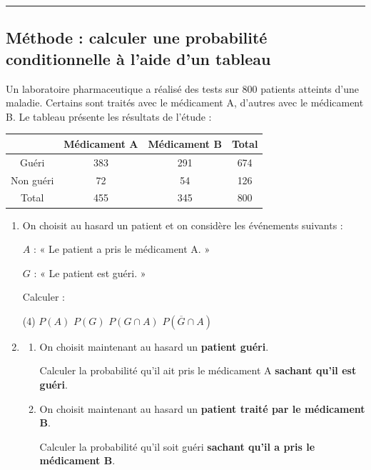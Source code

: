 \documentclass{article}
\theoremstyle{definition}
\begin{document}
\pagestyle{empty}


\large


{
  \normalsize
  \textbf{\Niveau} \hfill \textbf{\Chapitre} \hfill \textbf{\Document}
}
\hrule

\subsection*{Méthode : calculer une probabilité conditionnelle à l'aide d'un tableau}

\noindent

Un laboratoire pharmaceutique a réalisé des tests sur 800 patients atteints d'une maladie.
Certains sont traités avec le médicament A, d'autres avec le médicament B.
Le tableau présente les résultats de l'étude :

\begin{center}
\begin{tabular}{|c|c|c|c|}
\hline
 & Médicament A & Médicament B & Total \\
\hline
Guéri & 383 & 291 & 674 \\
\hline
Non guéri & 72 & 54 & 126 \\
\hline
Total & 455 & 345 & 800 \\
\hline
\end{tabular}
\end{center}

\begin{enumerate}
    \item On choisit au hasard un patient et on considère les événements suivants :

    $A$ : « Le patient a pris le médicament A. »

    $G$ : « Le patient est guéri. »

    Calculer :
    \begin{tasks}(4)
        \task $P(A)$
        \task $P(G)$
        \task $P(G \cap A)$
        \task $P(\overline{G} \cap A)$
    \end{tasks}

    \item
    \begin{enumerate}
        \item On choisit maintenant au hasard un \textbf{patient guéri}.
        
        Calculer la probabilité qu'il ait pris le médicament A \textbf{sachant qu'il est guéri}.

        \item On choisit maintenant au hasard un \textbf{patient traité par le médicament B}.
        
        Calculer la probabilité qu'il soit guéri \textbf{sachant qu'il a pris le médicament B}.
    \end{enumerate}
\end{enumerate}
\end{document}
